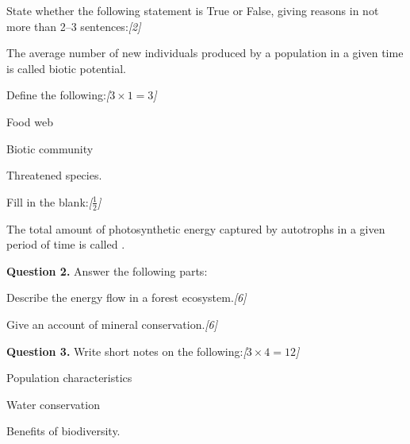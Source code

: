 \documentclass[11pt,a4paper]{article}
\newcommand{\pts}[1]{\hfill   \textit{[#1]}}
\begin{document}
\begin{parts}
  \item State whether the following statement is True or False, giving reasons in not more than 2--3 sentences:\pts{2}
  
\begin{parts}
    \item The average number of new individuals produced by a population in a given time is called biotic potential.
  \end{parts}

  \item Define the following:\pts{$3  \times 1 = 3$}
  
\begin{parts}
    \item Food web
    \item Biotic community
    \item Threatened species.
  \end{parts}

  \item Fill in the blank:\pts{$\frac{1}{2}$}
  
\begin{parts}
    \item The total amount of photosynthetic energy captured by autotrophs in a given period of time is called \underline{\hspace{3cm}}.
  \end{parts}
\end{parts}

\medskip


\noindent   \textbf{Question 2.} Answer the following parts:

\begin{parts}
  \item Describe the energy flow in a forest ecosystem.\pts{6}
  \item Give an account of mineral conservation.\pts{6}
\end{parts}

\medskip


\noindent   \textbf{Question 3.} Write short notes on the following:\pts{$3  \times 4 = 12$}

\begin{parts}
  \item Population characteristics
  \item Water conservation
  \item Benefits of biodiversity.
\end{parts}
\end{document}
